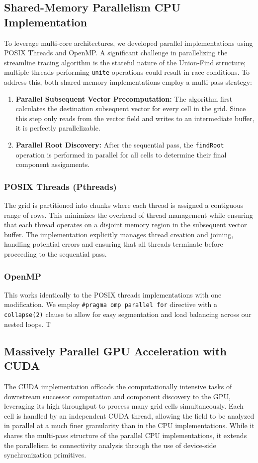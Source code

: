 \subsection{Shared-Memory Parallelism CPU Implementation}
To leverage multi-core architectures, we developed parallel implementations using POSIX Threads and OpenMP.
A significant challenge in parallelizing the streamline tracing algorithm is the stateful nature of the Union-Find structure; multiple threads performing \texttt{unite} operations could result in race conditions.
To address this, both shared-memory implementations employ a multi-pass strategy:
\begin{enumerate}
	\item \textbf{Parallel Subsequent Vector Precomputation:} The algorithm first calculates the destination subsequent vector for every cell in the grid.
	      Since this step only reads from the vector field and writes to an intermediate buffer, it is perfectly parallelizable.
	\item \textbf{Parallel Root Discovery:} After the sequential pass, the \texttt{findRoot} operation is performed in parallel for all cells to determine their final component assignments. \end{enumerate}

\subsubsection{POSIX Threads (Pthreads)}
The grid is partitioned into chunks where each thread is assigned a contiguous range of rows.
This minimizes the overhead of thread management while ensuring that each thread operates on a disjoint memory region in the subsequent vector buffer.
The implementation explicitly manages thread creation and joining, handling potential errors and ensuring that all threads terminate before proceeding to the sequential pass.

\subsubsection{OpenMP}
This works identically to the POSIX threads implementations with one modification.
We employ \texttt{\#pragma omp parallel for} directive with a \texttt{collapse(2)} clause to allow for easy segmentation and load balancing across our nested loops. T

\subsection{Massively Parallel GPU Acceleration with CUDA}
The CUDA implementation offloads the computationally intensive tasks of downstream successor computation and component discovery to the GPU, leveraging its high throughput to process many grid cells simultaneously. Each cell is handled by an independent CUDA thread, allowing the field to be analyzed in parallel at a much finer granularity than in the CPU implementations. While it shares the multi-pass structure of the parallel CPU implementations, it extends the parallelism to connectivity analysis through the use of device-side synchronization primitives.

